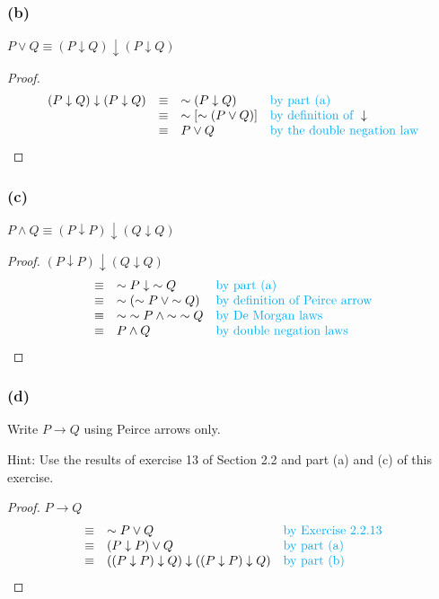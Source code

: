 \documentclass[14pt]{extarticle}
\begin{document}
\subsubsection{(b)}
$P \vee Q \equiv (P \downarrow Q) \downarrow (P \downarrow Q)$

\begin{proof}
$$
\begin{array}{rcll}
(P \downarrow Q) \downarrow (P \downarrow Q) & \equiv & {\sim (P \downarrow Q)} & \text{\color{cyan}by part (a)} \\
 & \equiv & {\sim[{\sim (P \vee Q)}]} & \text{\color{cyan}by definition of } \downarrow \\
 & \equiv & P \vee Q& \text{\color{cyan}by the double negation law} \\
\end{array}
$$
\end{proof}

\subsubsection{(c)}
$P \wedge Q \equiv (P \downarrow P) \downarrow (Q \downarrow Q)$

\begin{proof}
$(P \downarrow P) \downarrow (Q \downarrow Q)$
$$
\begin{array}{cll}
\equiv & {\sim P} \downarrow {\sim Q} & \text{\color{cyan}by part (a)} \\
\equiv & {\sim ({\sim P} \vee {\sim Q})} & \text{\color{cyan}by definition of Peirce arrow} \\
\equiv & {\sim {\sim P}} \wedge {\sim {\sim Q}} & \text{\color{cyan}by De Morgan laws} \\
\equiv & P \wedge Q & \text{\color{cyan}by double negation laws} \\
\end{array}
$$
\end{proof}

\subsubsection{(d)}
Write $P \to Q$ using Peirce arrows only.

Hint: Use the results of exercise 13 of Section 2.2 and part (a) and (c) of this exercise.

\begin{proof}
$P \to Q$
$$
\begin{array}{cll}
\equiv & {\sim P} \vee Q & \text{\color{cyan}by Exercise 2.2.13} \\
\equiv & (P \downarrow P) \vee Q & \text{\color{cyan}by part (a)} \\
\equiv & ((P \downarrow P) \downarrow Q) \downarrow ((P \downarrow P) \downarrow Q) & \text{\color{cyan}by part (b)} \\
\end{array}
$$
\end{proof}
\end{document}

